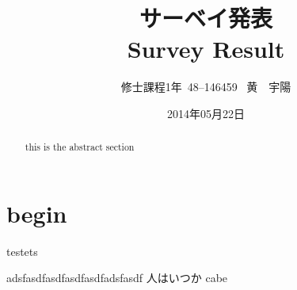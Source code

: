 \documentclass[a4j]{jarticle}
\title{サーベイ発表\\Survey Result}
\author{修士課程1年{\ }48--146459{\ } 黄　宇陽}
\date{2014年05月22日}
\begin{document}
\twocolumn
{}

\begin{abstract}
  this is the abstract section
\end{abstract}

\section{begin}
testets\cite{Smith:2012qr}

adsfasdfasdfasdfasdfadsfasdf
人はいつか
cabe

\printbibliography
\end{document}
